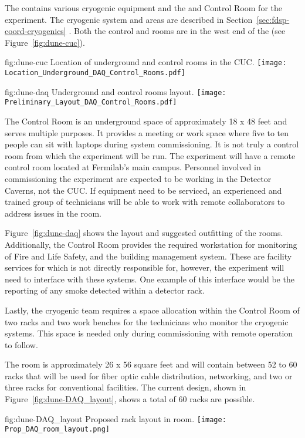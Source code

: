 The  contains various cryogenic equipment and the
 and Control Room for the  experiment.  The
cryogenic system and areas are described in
Section~\ref{sec:fdsp-coord-cryogenics} . Both the control and 
rooms are in the west end of the  (see
Figure~\ref{fig:dune-cuc}).
\begin{dunefigure}{fig:dune-cuc}
  {Location of underground  and control rooms in the CUC.}
  \texttt{[image: Location\_Underground\_DAQ\_Control\_Rooms.pdf]}
\end{dunefigure}
\begin{dunefigure}{fig:dune-daq}
  {Underground  and control rooms layout.}
  \texttt{[image: Preliminary\_Layout\_DAQ\_Control\_Rooms.pdf]}
\end{dunefigure}


The Control Room is an underground space of approximately 18 x 48 feet
and serves multiple purposes.  It provides a meeting or work space
where five to ten people can sit with laptops during system
commissioning.  It is not truly a control room from which the
experiment will be run.  The  experiment will have a remote
control room located at Fermilab's main campus.  Personnel involved in
commissioning the experiment are expected to be working in the
Detector Caverns, not the CUC.  If  equipment need to be serviced,
an experienced and trained group of technicians will be able to work
with remote collaborators to address issues in the  room.

Figure~\ref{fig:dune-daq} shows the layout and suggested outfitting of
the rooms. Additionally, the Control Room provides the required
workstation for monitoring of Fire and Life Safety, and the building
management system.  These are facility services for which  is not
directly responsible for, however, the experiment will need to
interface with these systems.  One example of this interface would be
the reporting of any smoke detected within a detector rack.

Lastly, the cryogenic team requires a space allocation within the
Control Room of two racks and two work benches for the technicians who
monitor the cryogenic systems.  This space is needed only during
commissioning with remote operation to follow.
       
The  room is approximately 26 x 56 square feet and will
contain between 52 to 60 racks that will be used for fiber optic cable
distribution, networking,   and two or three
racks for conventional facilities.  The current design, shown in
Figure~\ref{fig:dune-DAQ_layout}, shows a total of 60 racks are
possible.
\begin{dunefigure}{fig:dune-DAQ_layout}
  {Proposed rack layout in  room.}
  \texttt{[image: Prop\_DAQ\_room\_layout.png]}
\end{dunefigure}
  

